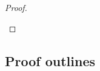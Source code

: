 \documentclass{article}
\begin{document}
\begin{proof}
\begin{itemize}
    \end{itemize}

\end{proof}

\subsection{Proof outlines}
\end{document}
